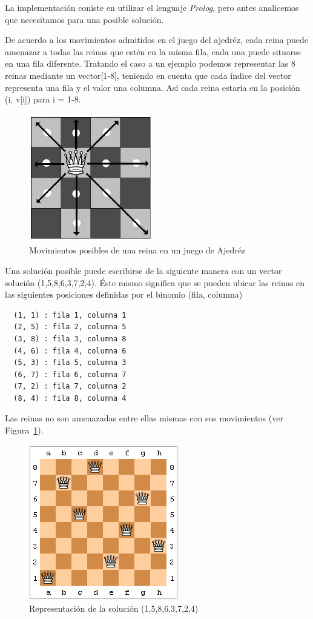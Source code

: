 \documentclass[a4paper,11pt]{article}
\begin{document}
  La implementación coniste en utilizar el lenguaje \textit{Prolog}, pero antes
  analicemos que necesitamos para una posible solución.

  De acuerdo a los movimientos admitidos en el juego del ajedréz, cada reina 
  puede amenazar a todas las reinas que estén en la misma fila, cada una 
  puede situarse en una fila diferente. Tratando el caso a un ejemplo podemos 
  representar las 8 reinas mediante un vector[1-8], teniendo en cuenta que cada 
  índice del vector representa una fila y el valor una columna. Así cada reina 
  estaría en la posición (i, v[i]) para i = 1-8.
  
\begin{figure}[h!]
  \centering
\includegraphics{docs/reina_movimientos.jpg}
  \caption{Movimientos posibles de una reina en un juego de Ajedréz}
\end{figure}

  Una solución posible puede escribirse de la siguiente manera con un vector
  solución (1,5,8,6,3,7,2,4). Éste mismo significa que se pueden ubicar las
  reinas en las siguientes posiciones definidas por el binomio (fila, columna)
\begin{lstlisting}
  (1, 1) : fila 1, columna 1
  (2, 5) : fila 2, columna 5
  (3, 8) : fila 3, columna 8
  (4, 6) : fila 4, columna 6
  (5, 3) : fila 5, columna 3
  (6, 7) : fila 6, columna 7
  (7, 2) : fila 7, columna 2 
  (8, 4) : fila 8, columna 4 
\end{lstlisting}
  Las reinas no son amenazadas entre ellas mismas con sus movimientos 
  (ver Figura~\ref{fig:ejemplo1}).
  
\begin{figure}[h!]
  \centering
\includegraphics{docs/example_solution_15863724.png}
  \caption{Representación de la solución (1,5,8,6,3,7,2,4)}
  \label{fig:ejemplo1}
\end{figure}
\end{document}
